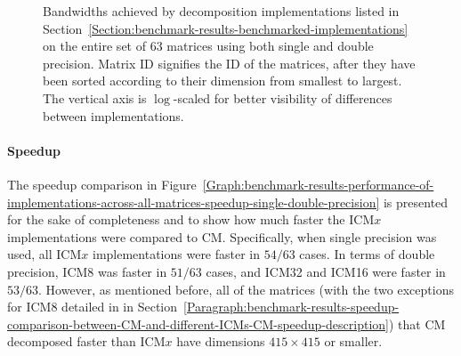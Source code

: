 \begin{figure}[h!]
\begin{subfigure}{\textwidth}
		\label{Graph:benchmark-results-performance-of-implementations-across-all-matrices-bandwidth-double-precision}
	\end{subfigure}
	\caption{Bandwidths achieved by decomposition implementations listed in Section~\ref{Section:benchmark-results-benchmarked-implementations} on the entire set of $ 63 $ matrices using both single and double precision. Matrix ID signifies the ID of the matrices, after they have been sorted according to their dimension from smallest to largest. The vertical axis is $ \log $-scaled for better visibility of differences between implementations.}
	\label{Graph:benchmark-results-performance-of-implementations-across-all-matrices-bandwidth-single-double-precision}
\end{figure}

\paragraph{Speedup} The speedup comparison in Figure~\ref{Graph:benchmark-results-performance-of-implementations-across-all-matrices-speedup-single-double-precision} is presented for the sake of completeness and to show how much faster the ICM$ x $ implementations were compared to CM. Specifically, when single precision was used, all ICM$ x $ implementations were faster in $ 54/63 $ cases. In terms of double precision, ICM8 was faster in $ 51/63 $ cases, and ICM32 and ICM16 were faster in $ 53/63 $. However, as mentioned before, all of the matrices (with the two exceptions for ICM8 detailed in \textit{} in Section~\ref{Paragraph:benchmark-results-speedup-comparison-between-CM-and-different-ICMs-CM-speedup-description}) that CM decomposed faster than ICM$ x $ have dimensions $ 415\times 415 $ or smaller.

